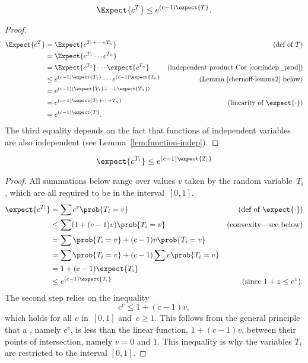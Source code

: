 \begin{lemma}\label{chernoff-lemma1}
\[
    \Expect{c^T} \leq e^{(c-1) \expect{T}}.
\]
\end{lemma}

\begin{proof}
\begin{align*}
    \Expect{c^T} & = \Expect{c^{T_1 + \cdots + T_n}}
                 & \text{(def of $T$)}\\
            & = \Expect{c^{T_1} \cdots c^{T_n}} \\
            & = \Expect{c^{T_1}}  \cdots \expect{c^{T_n}}
                 & \text{(independent product Cor~\ref{cor:indep_prod})}\\
            & \leq e^{(c-1) \expect{T_1}} \cdots  e^{(c-1) \expect{T_n}}
               & \text{(Lemma~\ref{chernoff-lemma2} below)}\\
            & = e^{(c-1) (\expect{T_1} + \cdots + \expect{T_n})} \\
            & = e^{(c-1) \expect{T_1 + \cdots + T_n}}
                   & \text{(linearity of $\expect{\cdot}$)}\\
            & = e^{(c-1) \expect{T}}.
\end{align*}
The third equality depends on the fact that functions of independent
variables are also independent (see Lemma~\ref{lem:function-indep}).
\end{proof}

\begin{lemma}
\label{chernoff-lemma2}
\[
    \expect{c^{T_i}} \leq e^{(c - 1) \expect{T_i}}
\]
\end{lemma}

\begin{proof}
All summations below range over values $v$ taken by the random
variable~$T_i$, which are all required to be in the interval~$[0, 1]$.
\begin{align*}
\expect{c^{T_i}}
     & = \sum c^v \prob{T_i = v}
              & \text{(def of $\expect{\cdot}$)}\\
     & \leq \sum (1 + (c-1) v) \prob{T_i = v} 
          & \text{(convexity---see below)}\\
     & = \sum \prob{T_i = v} + (c-1) v \prob{T_i = v} \\
     & = \sum \prob{T_i = v} +  (c-1) \sum v \prob{T_i = v} \\
     & = 1 + (c - 1) \expect{T_i} \\
     & \leq e^{(c - 1) \expect{T_i}}
           & \text{(since $1 + z \leq e^z$)}.
\end{align*}
The second step relies on the inequality
\[
c^v \leq 1 + (c-1) v,
\]
which holds for all $v$ in~$[0,1]$ and~$c \geq 1$.  This follows from
the general principle that a , namely $c^v$, is
less than the linear function, $1 + (c-1) v$, between their points of
intersection, namely $v = 0$ and $1$.  This inequality is why the
variables $T_i$ are restricted to the interval $[0, 1]$.
\end{proof}

